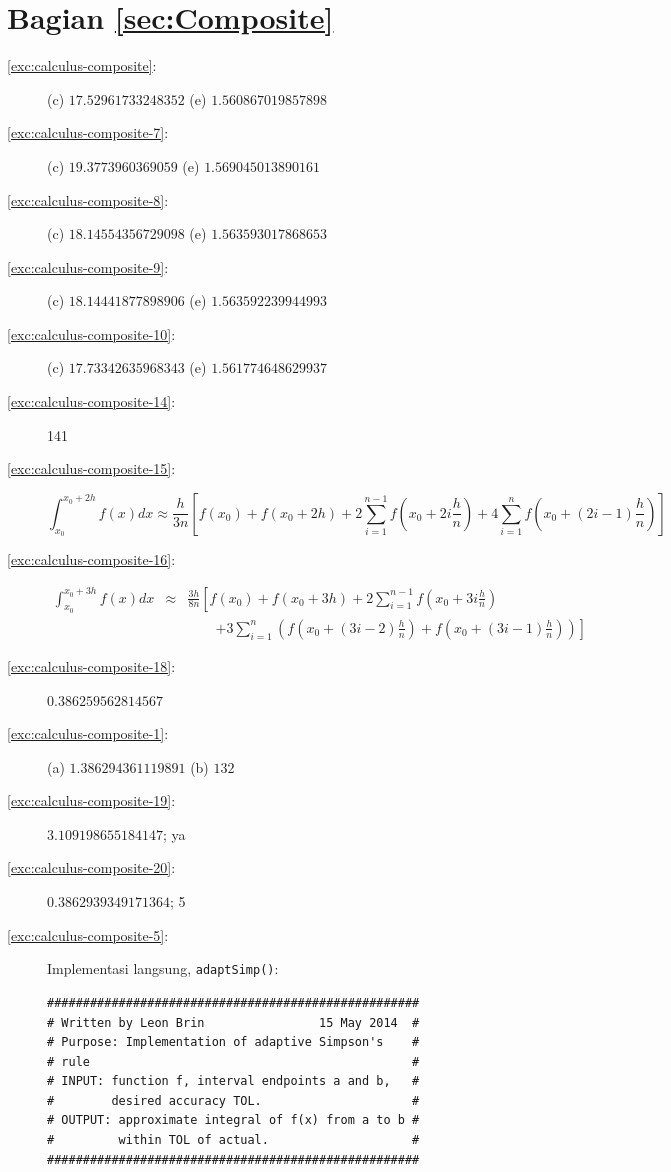 \section*{Bagian \ref{sec:Composite}}
\begin{description}
\item [{\ref{exc:calculus-composite}:}] (c) $17.52961733248352$ (e) $1.560867019857898$
\item [{\ref{exc:calculus-composite-7}:}] (c) $19.3773960369059$ (e)
$1.569045013890161$
\item [{\ref{exc:calculus-composite-8}:}] (c) $18.14554356729098$ (e)
$1.563593017868653$
\item [{\ref{exc:calculus-composite-9}:}] (c) $18.14441877898906$ (e)
$1.563592239944993$
\item [{\ref{exc:calculus-composite-10}:}] (c) $17.73342635968343$ (e)
$1.561774648629937$
\item [{\ref{exc:calculus-composite-14}:}] 141
\item [{\ref{exc:calculus-composite-15}:}] 
\[
\int_{x_{0}}^{x_{0}+2h}f(x)dx\approx\frac{h}{3n}\left[f(x_{0})+f(x_{0}+2h)+2\sum_{i=1}^{n-1}f\left(x_{0}+2i\frac{h}{n}\right)+4\sum_{i=1}^{n}f\left(x_{0}+\left(2i-1\right)\frac{h}{n}\right)\right]
\]
\item [{\ref{exc:calculus-composite-16}:}] 
\begin{eqnarray*}
\int_{x_{0}}^{x_{0}+3h}f(x)dx & \approx & \frac{3h}{8n}\left[f(x_{0})+f(x_{0}+3h)+2\sum_{i=1}^{n-1}f\left(x_{0}+3i\frac{h}{n}\right)\right.\\
 &  & \qquad\left.+3\sum_{i=1}^{n}\left(f\left(x_{0}+\left(3i-2\right)\frac{h}{n}\right)+f\left(x_{0}+\left(3i-1\right)\frac{h}{n}\right)\right)\right]
\end{eqnarray*}
\item [{\ref{exc:calculus-composite-18}:}] $0.386259562814567$
\item [{\ref{exc:calculus-composite-1}:}] (a) $1.386294361119891$ (b)
$132$
\item [{\ref{exc:calculus-composite-19}:}] $3.109198655184147$; ya
\item [{\ref{exc:calculus-composite-20}:}] $0.3862939349171364$; 5
\item [{\ref{exc:calculus-composite-5}:}] Implementasi langsung, \texttt{adaptSimp()}:

\begin{verbatim}
####################################################
# Written by Leon Brin                15 May 2014  #
# Purpose: Implementation of adaptive Simpson's    #
# rule                                             #
# INPUT: function f, interval endpoints a and b,   #
#        desired accuracy TOL.                     #
# OUTPUT: approximate integral of f(x) from a to b #
#         within TOL of actual.                    #
####################################################


\end{verbatim}
\end{description}
